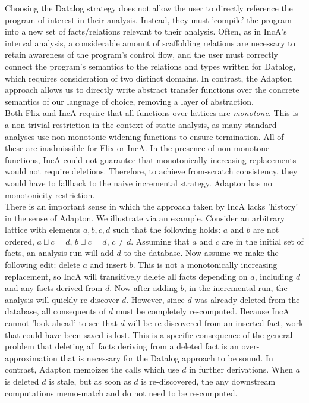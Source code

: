 \documentclass[acmlarge,anonymous]{acmart}\settopmatter{printfolios=true}
\begin{document}
Choosing the Datalog strategy does not allow the user to directly reference the program of interest in their analysis. Instead, they must 'compile' the program into a new set of facts/relations relevant to their analysis. Often, as in IncA's interval analysis, a considerable amount of scaffolding relations are necessary to retain awareness of the program's control flow, and the user must correctly connect the program's semantics to the relations and types written for Datalog, which requires consideration of two distinct domains. In contrast, the Adapton approach allows us to directly write abstract transfer functions over the concrete semantics of our language of choice, removing a layer of abstraction.\\

Both Flix and IncA require that all functions over lattices are \textit{monotone}. This is a non-trivial restriction in the context of static analysis, as many standard analyses use non-monotonic widening functions to ensure termination. All of these are inadmissible for Flix or IncA. In the presence of non-monotone functions, IncA could not guarantee that monotonically increasing replacements would not require deletions. Therefore, to achieve from-scratch consistency, they would have to fallback to the naive incremental strategy. Adapton has no monotonicity restriction.\\

There is an important sense in which the approach taken by IncA lacks 'history' in the sense of Adapton. We illustrate via an example. Consider an arbitrary lattice with elements $a, b, c, d$ such that the following holds: $a$ and $b$ are not ordered, $a \sqcup c = d$, $b \sqcup c = d$, $c \neq d$. Assuming that $a$ and $c$ are in the initial set of facts, an analysis run will add $d$ to the database. Now assume we make the following edit: delete $a$ and insert $b$. This is not a monotonically increasing replacement, so IncA will transitively delete all facts depending on $a$, including $d$ and any facts derived from $d$. Now after adding $b$, in the incremental run, the analysis will quickly re-discover $d$. However, since $d$ was already deleted from the database, all consequents of $d$ must be completely re-computed. Because IncA cannot 'look ahead' to see that $d$ will be re-discovered from an inserted fact, work that could have been saved is lost. This is a specific consequence of the general problem that deleting all facts deriving from a deleted fact is an over-approximation that is necessary for the Datalog approach to be sound. In contrast, Adapton memoizes the calls which use $d$ in further derivations. When $a$ is deleted $d$ is stale, but as soon as $d$ is re-discovered, the any downstream computations memo-match and do not need to be re-computed.\\
\end{document}
